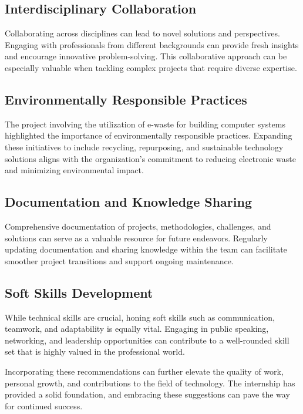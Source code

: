 \subsection{Interdisciplinary Collaboration}
Collaborating across disciplines can lead to novel solutions and perspectives. Engaging with professionals from different backgrounds can provide fresh insights and encourage innovative problem-solving. This collaborative approach can be especially valuable when tackling complex projects that require diverse expertise.

\subsection{Environmentally Responsible Practices}
The project involving the utilization of e-waste for building computer systems highlighted the importance of environmentally responsible practices. Expanding these initiatives to include recycling, repurposing, and sustainable technology solutions aligns with the organization's commitment to reducing electronic waste and minimizing environmental impact.

\subsection{Documentation and Knowledge Sharing}
Comprehensive documentation of projects, methodologies, challenges, and solutions can serve as a valuable resource for future endeavors. Regularly updating documentation and sharing knowledge within the team can facilitate smoother project transitions and support ongoing maintenance.

\subsection{Soft Skills Development}
While technical skills are crucial, honing soft skills such as communication, teamwork, and adaptability is equally vital. Engaging in public speaking, networking, and leadership opportunities can contribute to a well-rounded skill set that is highly valued in the professional world.

Incorporating these recommendations can further elevate the quality of work, personal growth, and contributions to the field of technology. The internship has provided a solid foundation, and embracing these suggestions can pave the way for continued success.



